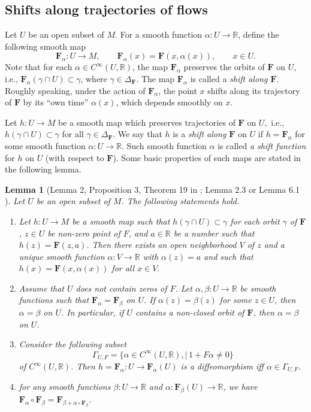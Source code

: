 \documentclass[10pt,reqno]{amsart}
\newtheorem{lemma}[subsection]{Lemma}
\newcommand{\bbR}{\mathbb{R}}
\newcommand{\bfF}{\mathbf{F}}
\begin{document}
\subsection{Shifts along trajectories of flows}\label{ssec:shift-map-def}
Let $U$ be an open subset of $M$. For a smooth function $\alpha:U\to \bbR$, define the following smooth map
\begin{equation}
\bfF_{\alpha}:U\to M,\qquad\bfF_{\alpha}(x) = \bfF(x,\alpha(x)), \qquad x\in U.
\end{equation}
Note that for each $\alpha\in C^{\infty}(U, \bbR)$, the map $\bfF_{\alpha}$ preserves the orbits of $\bfF$ on $U$, 
i.e., 
$\bfF_{\alpha}(\gamma\cap U)\subset \gamma$, where $\gamma\in \Delta_{\bfF}$. The map
$\bfF_{\alpha}$
is called a {\it shift along $\bfF$}.
Roughly speaking,  under the action of $\bfF_{\alpha}$, the point $x$  shifts along its trajectory of  $\bfF$  by its ``own time''  $\alpha(x)$, which depends smoothly  on $x$.

Let $h:U\to M$ be a smooth map which preserves trajectories of $\bfF$ on $U,$ i.e., $h(\gamma\cap U)\subset \gamma$ for all  $\gamma\in \Delta_{\bfF}$. 
We say that $h$ is a {\it shift along $\bfF$} on $U$ if  $h = \bfF_{\alpha}$ for some smooth function $\alpha:U\to \bbR$. Such smooth function $\alpha$ is called {\it a shift function} for $h$ on $U$ (with respect to $\bfF$).
Some basic properties of such maps are stated in the following lemma.




\begin{lemma}[Lemma 2, Proposition 3, Theorem 19 in \cite{Maksymenko:TA:2003}; Lemma 2.3 \cite{Maksymenko:OsakaJM:2011} or Lemma 6.1 \cite{Maksymenko:DefFuncI:2014}]\label{lm:shift-main}
	Let $U$ be an open subset of $M$.
	The following statements hold.
	\begin{enumerate}\label{lm:prop-sh-func}
		\item Let $h:U\to M$ be a smooth map such that $h(\gamma\cap U)\subset \gamma$ for each orbit $\gamma$ of $\bfF$, $z\in U$ be non-zero point of $F$, and $a\in \bbR$ be a number such that $h(z) = \bfF(z,a)$. Then there exists an open neighborhood $V$ of $z$ and a unique smooth function $\alpha:V\to \bbR$ with $\alpha(z) = a$ and such that  $h(x) = \bfF(x,\alpha(x))$ for all $x\in V.$ 
		\item Assume that $U$ does not contain zeros of $F$. Let 
		  $\alpha,\beta:U\to \bbR$ be smooth functions such that $\bfF_{\alpha} = \bfF_{\beta}$ on $U$. If $\alpha(z) = \beta(z)$ for some $z\in U$, then $\alpha = \beta$ on $U$. In particular, if $U$ contains a non-closed orbit of $\bfF$, then $\alpha = \beta$ on $U$.
		\item Consider the following subset 
		$$
		\Gamma_{U,F} = \{\alpha\in C^{\infty}(U,\bbR),|\, 1+F\alpha\neq  0  \}
		$$ 
		 of $C^{\infty}(U,\bbR)$.  Then $h = \bfF_{\alpha}:U\to \bfF_{\alpha}(U)$ is a diffeomorphism iff $\alpha\in \Gamma_{U,F}$.
		\item for any smooth functions $\beta:U\to \bbR$ and $\alpha:\bfF_{\beta}(U)\to \bbR$, we have
		$\bfF_{\alpha}\circ \bfF_{\beta} = \bfF_{\beta +\alpha\circ \bfF_{\beta}}$.
	\end{enumerate}
\end{lemma}
\end{document}
